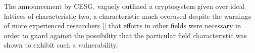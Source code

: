 The announcement by CESG, vaguely outlined a cryptosystem given over ideal lattices of characteristic two, a characteristic much overused despite the warnings of more experienced researchers [] that efforts in other fields were necessary in order to guard against the possibility that the particular field characteristic was shown to exhibit such a vulnerability. 



